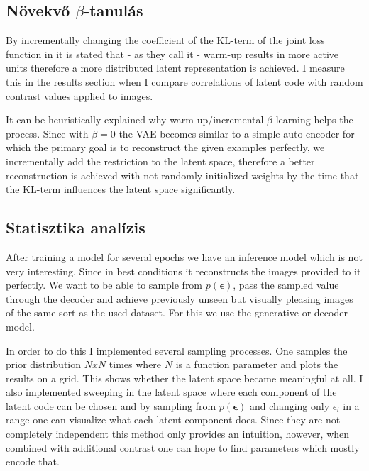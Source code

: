 \documentclass[12pt, english]{article}
\begin{document}
\subsection{Növekvő $\beta$-tanulás}

\vspace{5mm}

\par By incrementally changing the coefficient of the KL-term of the joint loss function in \cite{sonderby2016ladder} it is stated that - as they call it - warm-up results in more active units therefore a more distributed latent representation is achieved. I measure this in the results section when I compare correlations of latent code with random contrast values applied to images.

\vspace{4mm}

\par It can be heuristically explained why warm-up/incremental $\beta$-learning helps the process. Since with $\beta = 0$ the VAE becomes similar to a simple auto-encoder for which the primary goal is to reconstruct the given examples perfectly, we incrementally add the restriction to the latent space, therefore a better reconstruction is achieved with not randomly initialized weights by the time that the KL-term influences the latent space significantly.

\vspace{5mm}

\subsection{Statisztika analízis}

\vspace{5mm}

\par After training a model for several epochs we have an inference model which is not very interesting. Since in best conditions it reconstructs the images provided to it perfectly. We want to be able to sample from $p(\bm{\epsilon})$, pass the sampled value through the decoder and achieve previously unseen but visually pleasing images of the same sort as the used dataset. For this we use the generative or decoder model. 

\vspace{4mm}

\par In order to do this I implemented several sampling processes. One samples the prior distribution $N x N$ times where $N$ is a function parameter and plots the results on a grid. This shows whether the latent space became meaningful at all. I also implemented sweeping in the latent space where each component of the latent code can be chosen and by sampling from $p(\bm{\epsilon})$ and changing only $\epsilon_{i}$ in a range one can visualize what each latent component does. Since they are not completely independent this method only provides an intuition, however, when combined with additional contrast one can hope to find parameters which mostly encode that.
\end{document}
